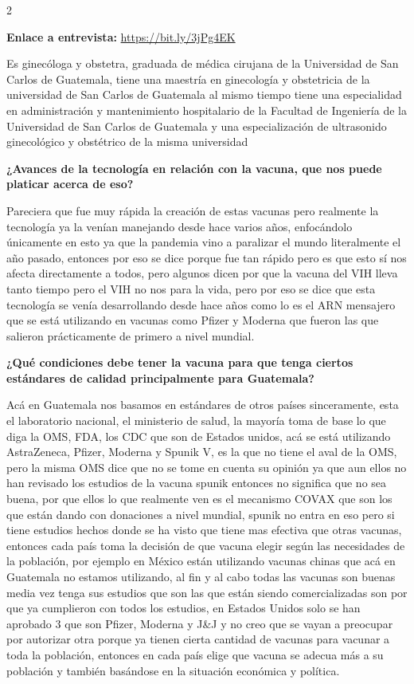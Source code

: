\documentclass[12pt,spanish,Letterpaper,openany]{book}
\begin{document}
\begin {multicols}{2}

\textbf{Enlace a entrevista:} \url{https://bit.ly/3jPg4EK}

Es ginecóloga y obstetra, graduada de médica cirujana de la Universidad de San Carlos de
Guatemala, tiene una maestría en ginecología y obstetricia de la universidad de San Carlos
de Guatemala al mismo tiempo tiene una especialidad en administración y mantenimiento
hospitalario de la Facultad de Ingeniería de la Universidad de San Carlos de Guatemala y una
especialización de ultrasonido ginecológico y obstétrico de la misma universidad

\textbf{¿Avances de la tecnología en relación con la vacuna, que nos puede platicar acerca de eso?}

Pareciera que fue muy rápida la creación de estas vacunas pero realmente la tecnología ya la
venían manejando desde hace varios años, enfocándolo únicamente en esto ya que la
pandemia vino a paralizar el mundo literalmente el año pasado, entonces por eso se dice
porque fue tan rápido pero es que esto sí nos afecta directamente a todos, pero algunos dicen
por que la vacuna del VIH lleva tanto tiempo pero el VIH no nos para la vida, pero por eso
se dice que esta tecnología se venía desarrollando desde hace años como lo es el ARN
mensajero que se está utilizando en vacunas como Pfizer y Moderna que fueron las que
salieron prácticamente de primero a nivel mundial.

\textbf{¿Qué condiciones debe tener la vacuna para que tenga ciertos estándares de calidad principalmente para Guatemala?}

Acá en Guatemala nos basamos en estándares de otros países sinceramente, esta el
laboratorio nacional, el ministerio de salud, la mayoría toma de base lo que diga la OMS,
FDA, los CDC que son de Estados unidos, acá se está utilizando AstraZeneca, Pfizer,
Moderna y Spunik V, es la que no tiene el aval de la OMS, pero la misma OMS dice que no
se tome en cuenta su opinión ya que aun ellos no han revisado los estudios de la vacuna
spunik entonces no significa que no sea buena, por que ellos lo que realmente ven es el
mecanismo COVAX que son los que están dando con donaciones a nivel mundial, spunik no
entra en eso pero si tiene estudios hechos donde se ha visto que tiene mas efectiva que otras
vacunas, entonces cada país toma la decisión de que vacuna elegir según las necesidades de
la población, por ejemplo en México están utilizando vacunas chinas que acá en Guatemala
no estamos utilizando, al fin y al cabo todas las vacunas son buenas media vez tenga sus
estudios que son las que están siendo comercializadas son por que ya cumplieron con todos
los estudios, en Estados Unidos solo se han aprobado 3 que son Pfizer, Moderna y J\&J y no
creo que se vayan a preocupar por autorizar otra porque ya tienen cierta cantidad de vacunas
para vacunar a toda la población, entonces en cada país elige que vacuna se adecua más a su
población y también basándose en la situación económica y política.


\end{multicols}
\end{document}
